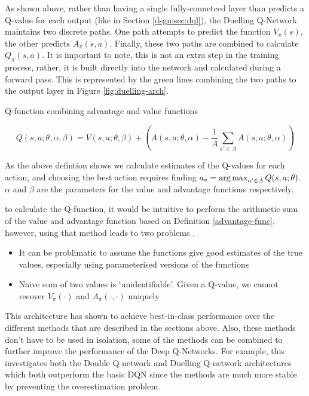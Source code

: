 As shown above, rather than having a single fully-connetced layer than predicts a Q-value for each output (like in Section \ref{dsgn:sec:dql}), the Duelling Q-Network maintains two discrete paths. One path attempts to predict the function $V_\pi(s)$, the other predicts $A_\pi(s, a)$. Finally, these two paths are combined to calculate $Q_\pi(s, a)$. It is important to note, this is not an extra step in the training process, rather, it is built directly into the network and calculated during a forward pass. This is represented by the green lines combining the two paths to the output layer in Figure \ref{fig:duelling-arch}.

\begin{defn}
	Q-function combining advantage and value functions

	\[
		Q(s, a; \theta, \alpha, \beta) = V(s, a; \theta, \beta) + \left( A(s, a; \theta, \alpha) - \frac{1}{A} \sum_{a'\in A} A(s, a; \theta, \alpha) \right)
	\]
\end{defn}

As the above defintion shows we calculate estimates of the Q-values for each action, and choosing the best action requires finding $a_* = \operatorname*{arg\,max}_{a' \in A} Q(s, a; \theta)$. $\alpha$ and $\beta$ are the parameters for the value and advantage functions respectively.

to calculate the Q-function, it would be intuitive to perform the arithmetic sum of the value and advantage function based on Definition \ref{advantage-func}, however, using that method leads to two problems \cite{wang2015dueling}.

\begin{itemize}
	\item It can be problimatic to assume the functions give good estimates of the true values, especially using parameterised versions of the functions
	\item Naive sum of two values is `unidentifiable'. Given a Q-value, we cannot recover $V_\pi(\cdot)$ and $A_\pi(\cdot, \cdot)$ uniquely
\end{itemize}

This architecture has shown to achieve best-in-class performance over the different methods that are described in the sections above. Also, these methods don't have to be used in isolation, some of the methods can be combined to further improve the performance of the Deep Q-Networks. For example, this investigates both the Double Q-network and Duelling Q-network architectures which both outperform the basic DQN since the methods are much more stable by preventing the overestimation problem.
